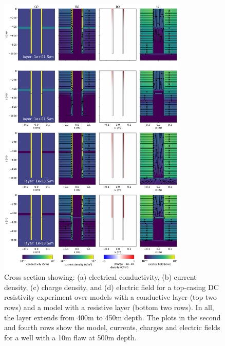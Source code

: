 \begin{figure}
    \begin{center}
    \includegraphics[width=0.8\textwidth]{figures/dc_casing/integrity_layer_physics.png}
    \end{center}
\caption{
    Cross section showing: (a) electrical conductivity, (b) current density, (c) charge density,
    and (d) electric field for a top-casing DC resistivity experiment over models with a conductive layer
    (top two rows) and a model with a resistive layer (bottom two rows). In all, the layer extends from
    400m to 450m depth. The plots in the second and fourth rows show the model, currents, charges and electric
    fields for a well with a 10m flaw at 500m depth.
}
\label{fig:integrity_layer_physics}
\end{figure}
